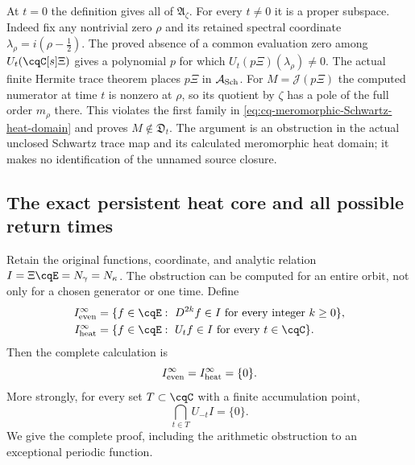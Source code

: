 At $t=0$ the definition gives all of $\mathfrak A_\zeta$.
For every $t\ne0$ it is a proper subspace. Indeed fix any
nontrivial zero $\rho$ and its retained spectral coordinate
$\lambda_\rho=i(\rho-\tfrac12)$. The proved absence of a
common evaluation zero among $U_t(\cqC[s]\Xi)$ gives a
polynomial $p$ for which
$U_t(p\Xi)(\lambda_\rho)\ne0$. The actual finite Hermite
trace theorem places $p\Xi$ in $\mathcal A_{\rm Sch}$.
For $M=\mathscr J(p\Xi)$ the computed numerator at time $t$
is nonzero at $\rho$, so its quotient by $\zeta$ has a pole
of the full order $m_\rho$ there. This violates the first
family in \eqref{eq:cq-meromorphic-Schwartz-heat-domain} and
proves $M\notin\mathfrak D_t$. The argument is an obstruction
in the actual unclosed Schwartz trace map and its calculated
meromorphic heat domain; it makes no identification of the
unnamed source closure.

\subsection{The exact persistent heat core and all possible return times}
\label{sec:cq-persistent-heat-core}
Retain the original functions, coordinate, and analytic relation
$I=\Xi\cqE=N_\gamma=N_\kappa$. The obstruction can be computed
for an entire orbit, not only for a chosen generator or one time.
Define
\begin{equation}\label{eq:cq-persistent-cores}
 \begin{aligned}
 I_{\rm even}^{\infty}
   &=\{f\in\cqE:\ D^{2k}f\in I\text{ for every integer }k\geq0\},\\
 I_{\rm heat}^{\infty}
   &=\{f\in\cqE:\ U_tf\in I\text{ for every }t\in\cqC\}.
 \end{aligned}
\end{equation}
Then the complete calculation is
\begin{equation}\label{eq:cq-persistent-core-zero}
 I_{\rm even}^{\infty}=I_{\rm heat}^{\infty}=\{0\}.
\end{equation}
More strongly, for every set $T\subset\cqC$ with a finite
accumulation point,
\begin{equation}\label{eq:cq-accumulating-heat-times}
 \bigcap_{t\in T}U_{-t}I=\{0\}.
\end{equation}
We give the complete proof, including the arithmetic obstruction
to an exceptional periodic function.

